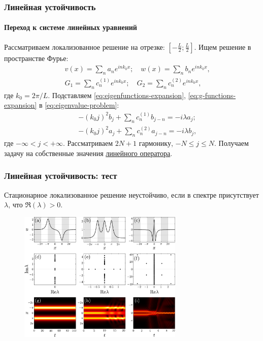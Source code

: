 \documentclass [10pt] {beamer}
\begin{document}
\begin{frame}
	\frametitle{Линейная устойчивость}
	\framesubtitle{Переход к системе линейных уравнений}
	
	Рассматриваем локализованное решение на отрезке: $[-\frac{L}{2}; \frac{L}{2}]$.
	Ищем решение в пространстве Фурье:
	\begin{eqnarray}
		&& 	v(x) = \sum \limits_n a_n e^{i n k_0 x}; \quad w(x) = \sum \limits_n b_n e^{i n k_0 x}, \label{eq:eigenfunctions-expansion} \\
		&& G_1 = \sum \limits_n c_n^{(1)} e^{i n k_0 x}; \quad G_2 = \sum \limits_n c_n^{(2)} e^{i n k_0 x} \label{eq:g-functions-expansion},
	\end{eqnarray}
	где $k_0 = 2 \pi / L$.
	Подставляем \eqref{eq:eigenfunctions-expansion}, \eqref{eq:g-functions-expansion} в \eqref{eq:eigenvalue-problem}:
	 \begin{eqnarray}
		&& -(k_0 j)^2 b_j + \sum \limits_n 	c_n^{(1)} b_{j - n} = -i \lambda a_j; \\
		&& -(k_0 j)^2 a_j + \sum \limits_n 	c_n^{(2)} a_{j - n} = -i \lambda b_j,
	\end{eqnarray}
	где $-\infty < j < +\infty$.
	Рассматриваем $2N+1$ гармонику, $-N \le j \le N$.
	Получаем задачу на собственные значения \underline{линейного оператора}.
\end{frame}

\begin{frame}
	\frametitle{Линейная устойчивость: тест}
	
	\begin{center}
		Стационарное локализованное решение неустойчиво, если в спектре присутствует $\lambda$, что $\mathfrak{R}(\lambda) > 0$.
	\end{center}
	
	\begin{figure}[h!]
	\includegraphics[width = 0.7\textwidth]{pic/stability demonstration for cosine equation}
	\end{figure}
\end{frame}
\end{document}
